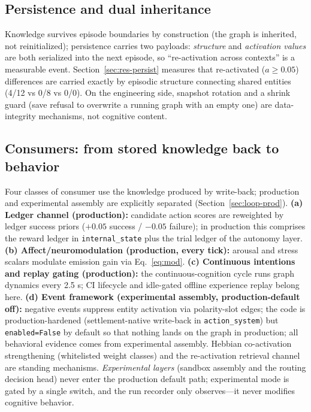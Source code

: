 \documentclass[10pt,a4paper]{article}
\begin{document}
\subsection{Persistence and dual inheritance}
\label{sec:arch-persist}
Knowledge survives episode boundaries by construction (the graph is inherited, not reinitialized); persistence carries two payloads: \emph{structure} and \emph{activation values} are both serialized into the next episode, so ``re-activation across contexts'' is a measurable event. Section~\ref{sec:res-persist} measures that re-activated ($a\ge0.05$) differences are carried exactly by episodic structure connecting shared entities (4/12 vs 0/8 vs 0/0). On the engineering side, snapshot rotation and a shrink guard (save refusal to overwrite a running graph with an empty one) are data-integrity mechanisms, not cognitive content.

\subsection{Consumers: from stored knowledge back to behavior}
\label{sec:arch-consumers}
Four classes of consumer use the knowledge produced by write-back; production and experimental assembly are explicitly separated (Section~\ref{sec:loop-prod}). \textbf{(a) Ledger channel (production):} candidate action scores are reweighted by ledger success priors ($+0.05$ success / $-0.05$ failure); in production this comprises the reward ledger in \texttt{internal\_state} plus the trial ledger of the autonomy layer. \textbf{(b) Affect/neuromodulation (production, every tick):} arousal and stress scalars modulate emission gain via Eq.~\ref{eq:mod}. \textbf{(c) Continuous intentions and replay gating (production):} the continuous-cognition cycle runs graph dynamics every 2.5 s; CI lifecycle and idle-gated offline experience replay belong here. \textbf{(d) Event framework (experimental assembly, production-default off):} negative events suppress entity activation via polarity-slot edges; the code is production-hardened (settlement-native write-back in \texttt{action\_system}) but \texttt{enabled=False} by default so that nothing lands on the graph in production; all behavioral evidence comes from experimental assembly. Hebbian co-activation strengthening (whitelisted weight classes) and the re-activation retrieval channel are standing mechanisms. \emph{Experimental layers} (sandbox assembly and the routing decision head) never enter the production default path; experimental mode is gated by a single switch, and the run recorder only observes---it never modifies cognitive behavior.
\end{document}
